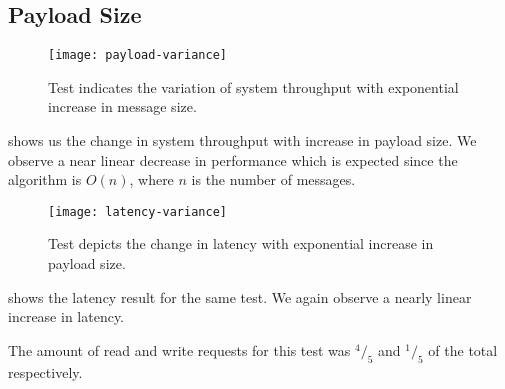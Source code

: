 \subsection{Payload Size}

\begin{figure}
  \begin{whole}
    \texttt{[image: payload-variance]}
    \caption[Payload Throughput Test]{%
      Test indicates the variation of system throughput with exponential
      increase in message size.
    }
    \label{figure:res.payload.throughput}
  \end{whole}
\end{figure}

 shows us the change in system throughput
with increase in payload size. We observe a near linear decrease in performance
which is expected since the algorithm is $O(n)$, where $n$ is the number of
messages.

\begin{figure}
  \begin{whole}
    \texttt{[image: latency-variance]}
    \caption[Payload Latency Test]{%
      Test depicts the change in latency with exponential increase in payload
      size.
    }
    \label{figure:res.payload.latency}
  \end{whole}
\end{figure}

 shows the latency result for the same test. We
again observe a nearly linear increase in latency.

The amount of read and write requests for this test was ${}^4/_5$ and
${}^1/_5$ of the total respectively.



